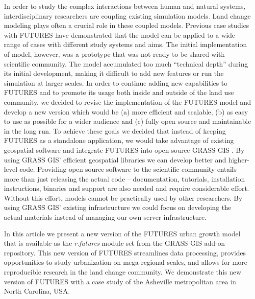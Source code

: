 \documentclass{isprs}
\begin{document}
In order to study the complex interactions between human and natural systems,
interdisciplinary researchers are coupling
existing simulation models.
Land change modeling plays often a crucial role in these coupled models.
Previous case studies with FUTURES have demonstrated 
that the model can be applied to a wide range of cases with different study systems and aims.
%
The initial implementation of model, however, was a prototype that was not ready
to be shared
with scientific community. 
%
The model accumulated too much ``technical depth'' \cite{easterbrook2014open} during its initial development, 
making it difficult to add new features or run the simulation at larger scales.
%
In order to continue adding new capabilities to FUTURES and to promote
its usage 
both inside and outside of 
the land use community,
we decided to revise the implementation of the FUTURES model 
and develop a new version which would be (a) more efficient and scalable, 
(b) as easy to use as possible for a wider audience and (c)
fully open source and maintainable in the long run.
To achieve these goals we 
decided that instead of keeping FUTURES as a standalone application,
we would take advantage of existing geospatial software and integrate FUTURES
into open source GRASS GIS \cite{Neteler08}.
By using GRASS GIS' efficient geospatial libraries
we can develop better and higher-level code.
%
Providing open source software to the scientific community entails more than just releasing the actual code -- 
documentation, tutorials, installation
instructions, binaries and support are also needed 
and require considerable effort. %
Without this effort, models cannot be practically used by other researchers.
%
By using GRASS GIS' existing infrastructure we could focus on developing the actual materials
instead of managing our own server infrastructure.

In this article we present a new version of the FUTURES urban growth model that is 
available as the \emph{r.futures} module set from the GRASS GIS add-on repository.
This new version of FUTURES
streamlines data processing, provides opportunities to study urbanization on mega-regional scales, 
and allows for more reproducible research in the land change community. 
We demonstrate this new version of FUTURES with a case study of the Asheville metropolitan area in North Carolina, USA.

\end{document}
